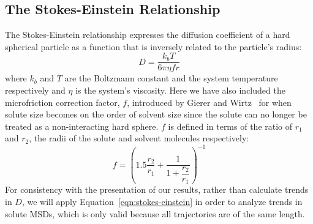 \documentclass[journal=jpcbfk,manuscript=article]{achemso}
\begin{document}
  \subsection{The Stokes-Einstein Relationship}\label{method:stokes}
  
  The Stokes-Einstein relationship expresses the diffusion coefficient of 
  a hard spherical particle as a function that is inversely related to the
  particle's radius:
  \begin{equation}
  D = \dfrac{k_bT}{6\pi\eta fr}
  \label{eqn:stokes-einstein}
  \end{equation}
  where $k_b$ and $T$ are the Boltzmann	constant and the system temperature
  respectively and $\eta$ is the system's viscosity. Here we have also 
  included the microfriction correction factor, $f$, introduced by 
  Gierer and Wirtz~\cite{gierer_molekulare_1953,chen_diffusion_1984} for when
  solute size becomes on the order of solvent size since the solute can no 
  longer be treated as a non-interacting hard sphere. $f$ is defined in terms
  of the ratio of $r_1$ and $r_2$, the radii of the solute and solvent molecules
  respectively:
  \begin{equation}
  f = \left(1.5\dfrac{r_2}{r_1} + \dfrac{1}{1 + \dfrac{r_2}{r_1}}\right)^{-1}
  \label{eqn:correction_factor}
  \end{equation}
  For consistency with the presentation of our results, rather than calculate trends
  in $D$, we will apply Equation~\ref{eqn:stokes-einstein} in order to analyze 
  trends in solute MSDs, which is only valid because all trajectories are of the 
  same length.
  
\end{document}
